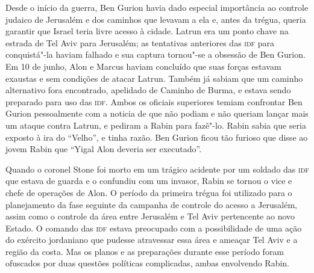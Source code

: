 Desde o início da guerra, Ben Gurion havia dado especial importância ao
controle judaico de Jerusalém e dos caminhos que levavam a ela e, antes
da trégua, queria garantir que Israel teria livre acesso à cidade. Latrun
era um ponto chave na estrada de Tel Aviv para Jerusalém; as tentativas
anteriores das \textsc{idf} para conquistá"-la haviam falhado e sua captura
tornou"-se a obsessão de Ben Gurion. Em 10 de junho, Alon e Marcus haviam
concluído que suas forças estavam exaustas e sem condições de
atacar Latrun. Também já sabiam que um caminho alternativo fora
encontrado, apelidado de Caminho de Burma, e estava sendo preparado para
uso das \textsc{idf}. Ambos os oficiais superiores temiam confrontar Ben Gurion
pessoalmente com a noticia de que não podiam e não queriam lançar mais
um ataque contra Latrun, e pediram a Rabin para fazê"-lo. Rabin sabia que
seria exposto à ira do ``Velho'', e tinha razão. Ben Gurion ficou tão
furioso que disse ao jovem Rabin que ``Yigal Alon deveria ser
executado''.

Quando o coronel Stone foi morto em um trágico acidente por um soldado
das \textsc{idf} que estava de guarda e o confundiu com um invasor, Rabin se
tornou o vice e chefe de operações de Alon. O período da primeira trégua
foi utilizado para o planejamento da fase seguinte da campanha de
controle do acesso a Jerusalém, assim como o controle da área entre
Jerusalém e Tel Aviv pertencente ao novo Estado. O comando das \textsc{idf}
estava preocupado com a possibilidade de uma ação do exército jordaniano
que pudesse atravessar essa área e ameaçar Tel Aviv e a região da costa.
Mas os planos e as preparações durante esse período foram ofuscados por
duas questões políticas complicadas, ambas envolvendo Rabin.

